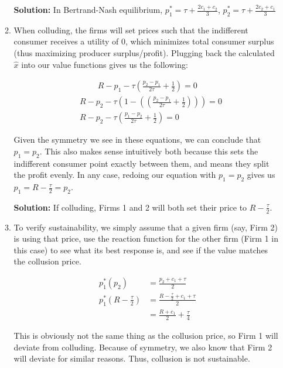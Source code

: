 \documentclass[12pt,letterpaper]{article}
\begin{document}
\begin{enumerate}
\begin{enumerate}
	{\color{blue}\textbf{Solution:} In Bertrand-Nash equilibrium, $p_1^* = \tau + \frac{2c_1 + c_2}{3}$, $p_2^* = \tau + \frac{2c_2 + c_1}{3}$}

	\item When colluding, the firms will set prices such that the indifferent consumer receives a utility of 0, which minimizes total consumer surplus (thus maximizing producer surplus/profit). Plugging back the calculated $\hat{x}$ into our value functions gives us the following:
	
	\begin{multicols}{2}
		\noindent
		\begin{align*}
			R - p_1 - \tau (\frac{p_2 - p_1}{2\tau} + \frac{1}{2}) = 0
		\end{align*}
		\noindent
		\begin{align*}
			&R - p_2 - \tau (1 - ((\frac{p_2 - p_1}{2\tau} + \frac{1}{2}))) = 0 \\
			&R - p_2 - \tau (\frac{p_1 - p_2}{2\tau} + \frac{1}{2}) = 0
		\end{align*}
	\end{multicols}

	Given the symmetry we see in these equations, we can conclude that $p_1 = p_2$. This also makes sense intuitively both because this sets the indifferent consumer point exactly between them, and means they split the profit evenly. In any case, redoing our equation with $p_1 = p_2$ gives us $p_1 = R - \frac{\tau}{2} = p_2$.

	{\color{blue}\textbf{Solution:} If colluding, Firms 1 and 2 will both set their price to $R - \frac{\tau}{2}$.}

	\item To verify sustainability, we simply assume that a given firm (say, Firm 2) is using that price, use the reaction function for the other firm (Firm 1 in this case) to see what its best response is, and see if the value matches the collusion price.
	
	\begin{align*}
		p_1^*(p_2) &= \frac{p_2 + c_1 + \tau}{2} \\
		p_1^*(R - \frac{\tau}{2}) &= \frac{R - \frac{\tau}{2} + c_1 + \tau}{2} \\
		&= \frac{R + c_1}{2} + \frac{\tau}{4}
	\end{align*}

	This is obviously not the same thing as the collusion price, so Firm 1 will deviate from colluding. Because of symmetry, we also know that Firm 2 will deviate for similar reasons. Thus, collusion is not sustainable.


\end{enumerate}
\end{enumerate}
\end{document}
